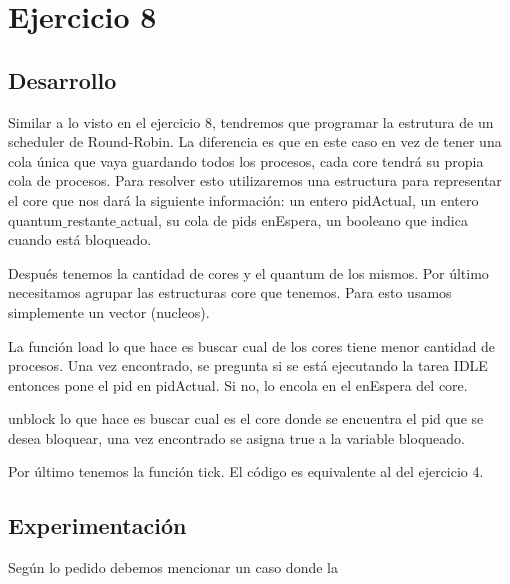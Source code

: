 \section{Ejercicio 8}


\subsection{Desarrollo}
Similar  a lo visto en el ejercicio 8, tendremos que programar la estrutura de un scheduler de Round-Robin. La diferencia es que en este caso en vez de tener una cola única que vaya guardando todos los procesos, cada core tendrá su propia cola de procesos. Para resolver esto utilizaremos una estructura para representar el core que nos dará la siguiente información: un entero pidActual, un entero quantum$\_$restante$\_$actual, su cola de pids enEspera, un booleano que indica cuando está bloqueado.

Después tenemos la cantidad de cores y el quantum de los mismos. Por último necesitamos agrupar las estructuras core que tenemos. Para esto usamos simplemente un vector (nucleos).

La función load lo que hace es buscar cual de los cores tiene menor cantidad de procesos. Una vez encontrado, se pregunta si se está ejecutando la tarea IDLE entonces pone el pid en pidActual. Si no, lo encola en el enEspera del core.

unblock lo que hace es buscar cual es el core donde se encuentra el pid que se desea bloquear, una vez encontrado se asigna true a la variable bloqueado.

Por último tenemos la función tick. El código es equivalente al del ejercicio 4.


\subsection{Experimentación}
Según lo pedido debemos mencionar un caso donde la 